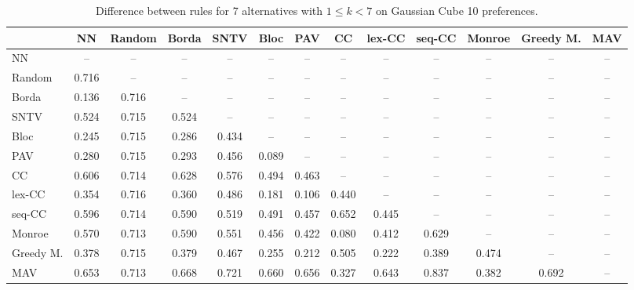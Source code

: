 
\begin{table*}[htbp]
\centering
\begin{tabular}{lcccccccccccc}
\toprule
 & NN & Random & Borda & SNTV & Bloc & PAV & CC & lex-CC & seq-CC & Monroe & Greedy M. & MAV \\
\midrule
NN & -- & -- & -- & -- & -- & -- & -- & -- & -- & -- & -- & -- \\
Random & \cellcolor{blue!71} 0.716 & -- & -- & -- & -- & -- & -- & -- & -- & -- & -- & -- \\
Borda & \cellcolor{blue!13} 0.136 & \cellcolor{blue!71} 0.716 & -- & -- & -- & -- & -- & -- & -- & -- & -- & -- \\
SNTV & \cellcolor{blue!52} 0.524 & \cellcolor{blue!71} 0.715 & \cellcolor{blue!52} 0.524 & -- & -- & -- & -- & -- & -- & -- & -- & -- \\
Bloc & \cellcolor{blue!24} 0.245 & \cellcolor{blue!71} 0.715 & \cellcolor{blue!28} 0.286 & \cellcolor{blue!43} 0.434 & -- & -- & -- & -- & -- & -- & -- & -- \\
PAV & \cellcolor{blue!28} 0.280 & \cellcolor{blue!71} 0.715 & \cellcolor{blue!29} 0.293 & \cellcolor{blue!45} 0.456 & \cellcolor{blue!8} 0.089 & -- & -- & -- & -- & -- & -- & -- \\
CC & \cellcolor{blue!60} 0.606 & \cellcolor{blue!71} 0.714 & \cellcolor{blue!62} 0.628 & \cellcolor{blue!57} 0.576 & \cellcolor{blue!49} 0.494 & \cellcolor{blue!46} 0.463 & -- & -- & -- & -- & -- & -- \\
lex-CC & \cellcolor{blue!35} 0.354 & \cellcolor{blue!71} 0.716 & \cellcolor{blue!36} 0.360 & \cellcolor{blue!48} 0.486 & \cellcolor{blue!18} 0.181 & \cellcolor{blue!10} 0.106 & \cellcolor{blue!44} 0.440 & -- & -- & -- & -- & -- \\
seq-CC & \cellcolor{blue!59} 0.596 & \cellcolor{blue!71} 0.714 & \cellcolor{blue!59} 0.590 & \cellcolor{blue!51} 0.519 & \cellcolor{blue!49} 0.491 & \cellcolor{blue!45} 0.457 & \cellcolor{blue!65} 0.652 & \cellcolor{blue!44} 0.445 & -- & -- & -- & -- \\
Monroe & \cellcolor{blue!56} 0.570 & \cellcolor{blue!71} 0.713 & \cellcolor{blue!59} 0.590 & \cellcolor{blue!55} 0.551 & \cellcolor{blue!45} 0.456 & \cellcolor{blue!42} 0.422 & \cellcolor{blue!8} 0.080 & \cellcolor{blue!41} 0.412 & \cellcolor{blue!62} 0.629 & -- & -- & -- \\
Greedy M. & \cellcolor{blue!37} 0.378 & \cellcolor{blue!71} 0.715 & \cellcolor{blue!37} 0.379 & \cellcolor{blue!46} 0.467 & \cellcolor{blue!25} 0.255 & \cellcolor{blue!21} 0.212 & \cellcolor{blue!50} 0.505 & \cellcolor{blue!22} 0.222 & \cellcolor{blue!38} 0.389 & \cellcolor{blue!47} 0.474 & -- & -- \\
MAV & \cellcolor{blue!65} 0.653 & \cellcolor{blue!71} 0.713 & \cellcolor{blue!66} 0.668 & \cellcolor{blue!72} 0.721 & \cellcolor{blue!66} 0.660 & \cellcolor{blue!65} 0.656 & \cellcolor{blue!32} 0.327 & \cellcolor{blue!64} 0.643 & \cellcolor{blue!83} 0.837 & \cellcolor{blue!38} 0.382 & \cellcolor{blue!69} 0.692 & -- \\
\bottomrule
\end{tabular}

\caption{Difference between rules for 7 alternatives with $1 \leq k < 7$ on Gaussian Cube 10 preferences.}
\label{tab:rule_distance_heatmap-m=[7]-pref_dist=euclidean__args__dimensions=10_-_space=gaussian_cube}
\end{table*}
    